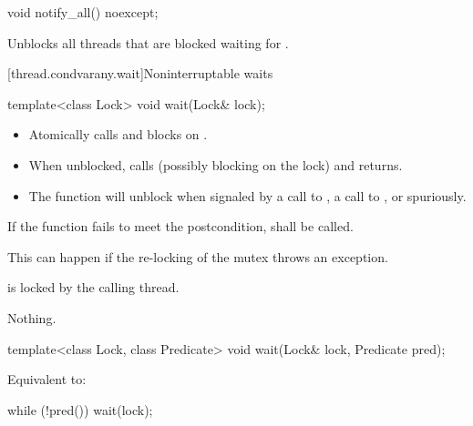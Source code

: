 %
\begin{itemdecl}
void notify_all() noexcept;
\end{itemdecl}

\begin{itemdescr}
\pnum\effects Unblocks all threads that are blocked waiting for .
\end{itemdescr}



{\color{insertcolor}
[thread.condvarany.wait]{Noninterruptable waits}
}

%
\begin{itemdecl}
template<class Lock>
  void wait(Lock& lock);
\end{itemdecl}

\begin{itemdescr}
\pnum
\effects
\begin{itemize}
\item Atomically calls  and blocks on .
\item When unblocked, calls  (possibly blocking on the lock) and returns.
\item The function will unblock when signaled by a call to ,
a call to , or spuriously.
\end{itemize}

\pnum
\remarks
If the function fails to meet the postcondition, 
shall be called.
\begin{note} This can happen if the re-locking of the mutex throws an exception. \end{note}

\pnum\postconditions {} is locked by the calling thread.

\pnum\throws Nothing.

\end{itemdescr}


%
\begin{itemdecl}
template<class Lock, class Predicate>
  void wait(Lock& lock, Predicate pred);
\end{itemdecl}

\begin{itemdescr}
\pnum
\effects Equivalent to:
\begin{codeblock}
while (!pred())
  wait(lock);
\end{codeblock}
\end{itemdescr}


